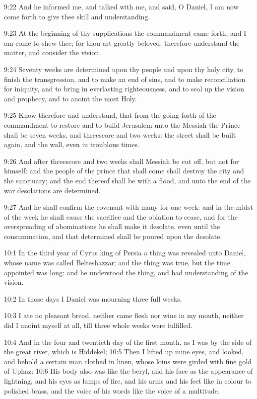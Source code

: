 9:22 And he informed me, and talked with me, and said, O Daniel, I am
now come forth to give thee skill and understanding.

9:23 At the beginning of thy supplications the commandment came forth,
and I am come to shew thee; for thou art greatly beloved: therefore
understand the matter, and consider the vision.

9:24 Seventy weeks are determined upon thy people and upon thy holy
city, to finish the transgression, and to make an end of sins, and to
make reconciliation for iniquity, and to bring in everlasting
righteousness, and to seal up the vision and prophecy, and to anoint
the most Holy.

9:25 Know therefore and understand, that from the going forth of the
commandment to restore and to build Jerusalem unto the Messiah the
Prince shall be seven weeks, and threescore and two weeks: the street
shall be built again, and the wall, even in troublous times.

9:26 And after threescore and two weeks shall Messiah be cut off, but
not for himself: and the people of the prince that shall come shall
destroy the city and the sanctuary; and the end thereof shall be with
a flood, and unto the end of the war desolations are determined.

9:27 And he shall confirm the covenant with many for one week: and in
the midst of the week he shall cause the sacrifice and the oblation to
cease, and for the overspreading of abominations he shall make it
desolate, even until the consummation, and that determined shall be
poured upon the desolate.

10:1 In the third year of Cyrus king of Persia a thing was revealed
unto Daniel, whose name was called Belteshazzar; and the thing was
true, but the time appointed was long: and he understood the thing,
and had understanding of the vision.

10:2 In those days I Daniel was mourning three full weeks.

10:3 I ate no pleasant bread, neither came flesh nor wine in my mouth,
neither did I anoint myself at all, till three whole weeks were
fulfilled.

10:4 And in the four and twentieth day of the first month, as I was by
the side of the great river, which is Hiddekel; 10:5 Then I lifted up
mine eyes, and looked, and behold a certain man clothed in linen,
whose loins were girded with fine gold of Uphaz: 10:6 His body also
was like the beryl, and his face as the appearance of lightning, and
his eyes as lamps of fire, and his arms and his feet like in colour to
polished brass, and the voice of his words like the voice of a
multitude.

